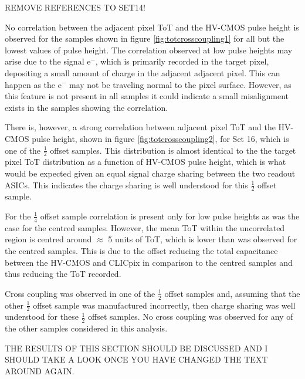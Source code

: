 REMOVE REFERENCES TO SET14!

No correlation between the adjacent pixel ToT and the HV-CMOS pulse height is observed for the samples shown in figure \ref{fig:totcrosscoupling1} for all but the lowest values of pulse height.  The correlation observed at low pulse heights may arise due to the signal $\text{e}^{-}$, which is primarily recorded in the target pixel, depositing a small amount of charge in the adjacent adjacent pixel.  This can happen as the $\text{e}^{-}$ may not be traveling normal to the pixel surface.  However, as this feature is not present in all samples it could indicate a small misalignment exists in the samples showing the correlation.  

There is, however, a strong correlation between adjacent pixel ToT and the HV-CMOS pulse height, shown in figure \ref{fig:totcrosscoupling2}, for Set 16, which is one of the $\frac{1}{2}$ offset samples.  This distribution is almost identical to the the target pixel ToT distribution as a function of HV-CMOS pulse height, which is what would be expected given an equal signal charge sharing between the two readout ASICs.  This indicates the charge sharing is well understood for this $\frac{1}{2}$ offset sample.   

For the $\frac{1}{4}$ offset sample correlation is present only for low pulse heights as was the case for the centred samples.  However, the mean ToT within the uncorrelated region is centred around $\approx$ 5 units of ToT, which is lower than was observed for the centred samples.  This is due to the offset reducing the total capacitance between the HV-CMOS and CLICpix in comparison to the centred samples and thus reducing the ToT recorded.

Cross coupling was observed in one of the $\frac{1}{2}$ offset samples and, assuming that the other $\frac{1}{2}$ offset sample was manufactured incorrectly, then charge sharing was well understood for these $\frac{1}{2}$ offset samples.  No cross coupling was observed for any of the other samples considered in this analysis.  

THE RESULTS OF THIS SECTION SHOULD BE DISCUSSED AND I SHOULD TAKE A LOOK ONCE YOU HAVE CHANGED THE TEXT AROUND AGAIN.

